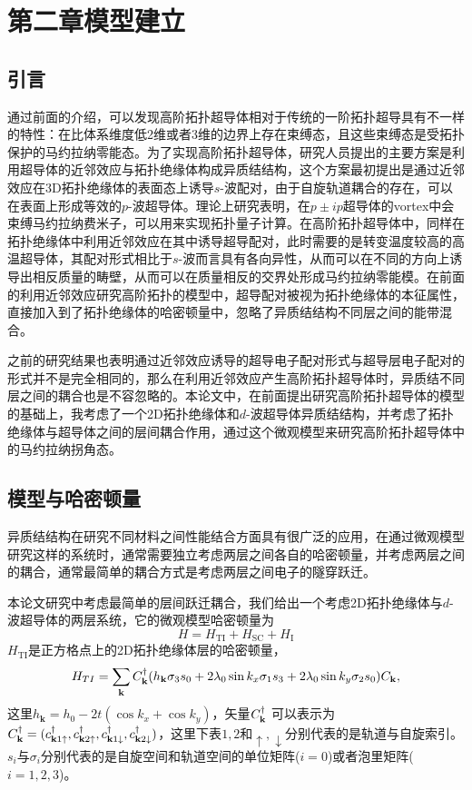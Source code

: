 \section{第二章\quad 模型建立}
\subsection{引言}
 通过前面的介绍，可以发现高阶拓扑超导体相对于传统的一阶拓扑超导具有不一样的特性：在比体系维度低2维或者3维的边界上存在束缚态，且这些束缚态是受拓扑保护的马约拉纳零能态。为了实现高阶拓扑超导体，研究人员提出的主要方案是利用超导体的近邻效应与拓扑绝缘体构成异质结结构，这个方案最初提出是通过近邻效应在3D拓扑绝缘体的表面态上诱导$s$-波配对，由于自旋轨道耦合的存在，可以在表面上形成等效的$p$-波超导体。理论上研究表明，在$p\pm ip$超导体的vortex中会束缚马约拉纳费米子，可以用来实现拓扑量子计算。在高阶拓扑超导体中，同样在拓扑绝缘体中利用近邻效应在其中诱导超导配对，此时需要的是转变温度较高的高温超导体，其配对形式相比于$s$-波而言具有各向异性，从而可以在不同的方向上诱导出相反质量的畴壁，从而可以在质量相反的交界处形成马约拉纳零能模。在前面的利用近邻效应研究高阶拓扑的模型中，超导配对被视为拓扑绝缘体的本征属性，直接加入到了拓扑绝缘体的哈密顿量中，忽略了异质结结构不同层之间的能带混合。

 之前的研究结果也表明通过近邻效应诱导的超导电子配对形式与超导层电子配对的形式并不是完全相同的\cite{re48,re49}，那么在利用近邻效应产生高阶拓扑超导体时，异质结不同层之间的耦合也是不容忽略的。本论文中，在前面提出研究高阶拓扑超导体的模型\cite{re27,re28,re29}的基础上，我考虑了一个2D拓扑绝缘体和$d$-波超导体异质结结构，并考虑了拓扑绝缘体与超导体之间的层间耦合作用，通过这个微观模型来研究高阶拓扑超导体中的马约拉纳拐角态。
\subsection{模型与哈密顿量}
 异质结结构在研究不同材料之间性能结合方面具有很广泛的应用，在通过微观模型研究这样的系统时，通常需要独立考虑两层之间各自的哈密顿量，并考虑两层之间的耦合，通常最简单的耦合方式是考虑两层之间电子的隧穿跃迁。

 本论文研究中考虑最简单的层间跃迁耦合，我们给出一个考虑2D拓扑绝缘体与$d$-波超导体的两层系统，它的微观模型哈密顿量为
\begin{equation}
H=H_\mathrm{TI}+H_\mathrm{SC}+H_\mathrm{I}\label{ham}
\end{equation}
$H_\mathrm{TI}$是正方格点上的2D拓扑绝缘体层的哈密顿量\cite{re56,re57}，
\begin{equation}
\begin{aligned}
H_{TI} =\sum_{{\bf k}}C_{{\bf k}}^\dagger (h_\mathbf{k}\sigma_3s_0+2\lambda_{0}\sin k_x\sigma_1s_3+2\lambda_0\sin k_y\sigma_2 s_0)C_{{\bf k}},
\end{aligned}
\end{equation}
这里$h_\mathbf{k}=h_0-2t(\cos k_x+\cos k_y)$，矢量$C^\dagger_{\bf k}$ 可以表示为$C^\dagger_{\bf k}=(c^\dagger_{{\bf k}1\uparrow},c^\dagger_{{\bf k}2\uparrow},c^\dagger_{{\bf k}1\downarrow},c^\dagger_{{\bf k}2\downarrow})$，这里下表$1,2$和$\uparrow,\downarrow$分别代表的是轨道与自旋索引。$s_i$与$\sigma_i$分别代表的是自旋空间和轨道空间的单位矩阵($i=0$)或者泡里矩阵($i=1,2,3$)。

